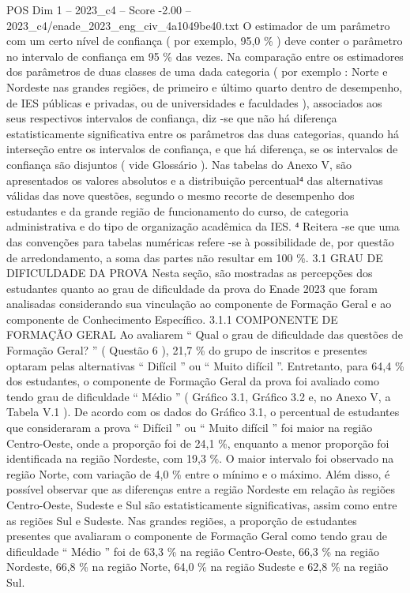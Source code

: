 \begin{textsample}{POS Dim 1 – 2023\_c4 – Score -2.00 – 2023\_c4/enade\_2023\_eng\_civ\_4a1049be40.txt}
O estimador de um parâmetro com um certo nível de confiança ( por exemplo, 95,0 \% ) deve conter o parâmetro no intervalo de confiança em 95 \% das vezes.
Na comparação entre os estimadores dos parâmetros de duas classes de uma dada categoria ( por exemplo : Norte e Nordeste nas grandes regiões, de primeiro e último quarto dentro de desempenho, de IES públicas e privadas, ou de universidades e faculdades ), associados aos seus respectivos intervalos de confiança, diz -se que não há diferença estatisticamente significativa entre os parâmetros das duas categorias, quando há interseção entre os intervalos de confiança, e que há diferença, se os intervalos de confiança são disjuntos ( vide Glossário ).
Nas tabelas do Anexo V, são apresentados os valores absolutos e a distribuição percentual⁴ das alternativas válidas das nove questões, segundo o mesmo recorte de desempenho dos estudantes e da grande região de funcionamento do curso, de categoria administrativa e do tipo de organização acadêmica da IES. ⁴ Reitera -se que uma das convenções para tabelas numéricas refere -se à possibilidade de, por questão de arredondamento, a soma das partes não resultar em 100 \%. 3.1 GRAU DE DIFICULDADE DA PROVA Nesta seção, são mostradas as percepções dos estudantes quanto ao grau de dificuldade da prova do Enade 2023 que foram analisadas considerando sua vinculação ao componente de Formação Geral e ao componente de Conhecimento Específico. 3.1.1 COMPONENTE DE FORMAÇÃO GERAL Ao avaliarem “ Qual o grau de dificuldade das questões de Formação Geral? ” ( Questão 6 ), 21,7 \% do grupo de inscritos e presentes optaram pelas alternativas “ Difícil ” ou “ Muito difícil ”.
Entretanto, para 64,4 \% dos estudantes, o componente de Formação Geral da prova foi avaliado como tendo grau de dificuldade “ Médio ” ( Gráfico 3.1, Gráfico 3.2 e, no Anexo V, a Tabela V.1 ).
De acordo com os dados do Gráfico 3.1, o percentual de estudantes que consideraram a prova “ Difícil ” ou “ Muito difícil ” foi maior na região Centro-Oeste, onde a proporção foi de 24,1 \%, enquanto a menor proporção foi identificada na região Nordeste, com 19,3 \%.
O maior intervalo foi observado na região Norte, com variação de 4,0 \% entre o mínimo e o máximo.
Além disso, é possível observar que as diferenças entre a região Nordeste em relação às regiões Centro-Oeste, Sudeste e Sul são estatisticamente significativas, assim como entre as regiões Sul e Sudeste.
Nas grandes regiões, a proporção de estudantes presentes que avaliaram o componente de Formação Geral como tendo grau de dificuldade “ Médio ” foi de 63,3 \% na região Centro-Oeste, 66,3 \% na região Nordeste, 66,8 \% na região Norte, 64,0 \% na região Sudeste e 62,8 \% na região Sul.

\end{textsample}
